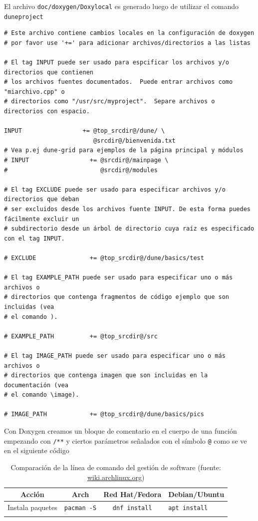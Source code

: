 \begin{frame}[fragile]
	El archivo \lstinline{doc/doxygen/Doxylocal} es generado luego de utilizar el comando \lstinline{duneproject}
	\begin{lstlisting}
# Este archivo contiene cambios locales en la configuración de doxygen
# por favor use '+=' para adicionar archivos/directorios a las listas

# El tag INPUT puede ser usado para espcificar los archivos y/o directorios que contienen  
# los archivos fuentes documentados.  Puede entrar archivos como "miarchivo.cpp" o
# directorios como "/usr/src/myproject".  Separe archivos o directorios con espacio.

INPUT                 += @top_srcdir@/dune/ \
                         @srcdir@/bienvenida.txt
# Vea p.ej dune-grid para ejemplos de la página principal y módulos
# INPUT                 += @srcdir@/mainpage \
#                          @srcdir@/modules

# El tag EXCLUDE puede ser usado para especificar archivos y/o directorios que deban
# ser excluidos desde los archivos fuente INPUT. De esta forma puedes fácilmente excluir un
# subdirectorio desde un árbol de directorio cuya raíz es especificado con el tag INPUT.

# EXCLUDE               += @top_srcdir@/dune/basics/test

# El tag EXAMPLE_PATH puede ser usado para especificar uno o más archivos o
# directorios que contenga fragmentos de código ejemplo que son incluidas (vea
# el comando ).

# EXAMPLE_PATH          += @top_srcdir@/src

# El tag IMAGE_PATH puede ser usado para especificar uno o más archivos o
# directorios que contenga imagen que son incluidas en la documentación (vea
# el comando \image).

# IMAGE_PATH            += @top_srcdir@/dune/basics/pics
\end{lstlisting}
\end{frame}

\begin{frame}[fragile]
	Con Doxygen creamos un bloque de comentario en el cuerpo de una función empezando con \lstinline{/**} y ciertos parámetros señalados con el símbolo \lstinline{@} como se ve en el siguiente código
\end{frame}

\begin{frame}[fragile]
	\begin{table}[ht!]
		\caption{Comparación de la línea de comando del gestión de software (fuente: \url{wiki.archlinux.org})}
		\centering\footnotesize
		\begin{tabular}{cccp{50pt}}
			\toprule
			Acción           & Arch                   & Red Hat/Fedora         & Debian/Ubuntu
			\tabularnewline
			\midrule
			Instala paquetes & \lstinline|pacman -S| & \lstinline|dnf install| & \lstinline|apt install|
			\tabularnewline
			\tabularnewline
			\bottomrule
		\end{tabular}
	\end{table}
\end{frame}

